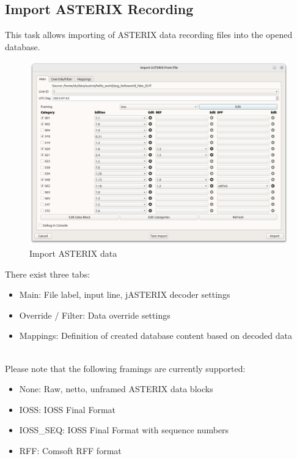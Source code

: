 \subsection{Import ASTERIX Recording}
\label{sec:ui_import_asterix}

This task allows importing of ASTERIX data recording files into the opened database. \\

\begin{figure}[H]
  \center
    \hspace*{-0.5cm}
    \includegraphics[width=17cm]{figures/asterix_import_data.png}
  \caption{Import ASTERIX data}
\end{figure}

There exist three tabs:

\begin{itemize}
\item Main: File label, input line, jASTERIX decoder settings
\item Override / Filter: Data override settings
\item Mappings: Definition of created database content based on decoded data
\end{itemize}
\ \\

Please note that the following framings are currently supported:

\begin{itemize}
\item None: Raw, netto, unframed ASTERIX data blocks
\item IOSS: IOSS Final Format
\item IOSS\_SEQ: IOSS Final Format with sequence numbers
\item RFF: Comsoft RFF format
\end{itemize}
\ \\

